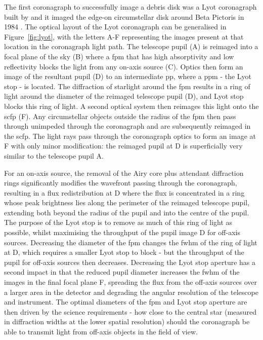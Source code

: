 \documentclass[letterpaper]{ar-1col}
\newcommand{\acc}[1]{\entry{\acs{#1}}{\acl{#1}}}
\begin{document}
The first coronagraph to successfully image a debris disk was a Lyot coronagraph built by \citet{Vilas87} and it imaged the edge-on circumstellar disk around Beta Pictoris in 1984 \citep{Smith84}.
%
The optical layout of the Lyot coronagraph can be generalised in Figure~\ref{fig:lyot}, with the letters A-F representing the images present at that location in the coronagraph light path.
%
The telescope pupil (A) is reimaged into a focal plane of the sky (B) where a \ac{fpm} that has high absorptivity and low reflectivity blocks the light from any on-axis source (C).
%
Optics then form an image of the resultant pupil (D) to an intermediate \ac{pp}, where a \ac{ppm} - the Lyot stop - is located.
%
The diffraction of starlight around the \ac{fpm} results in a ring of light around the diameter of the reimaged telescope pupil (D), and Lyot stop blocks this ring of light.
%
A second optical system then reimages this light onto the \ac{scfp} (F).
%
Any circumstellar objects outside the radius of the \ac{fpm} then pass through unimpeded through the coronagraph and are subsequently reimaged in the \ac{scfp}.
%
The light rays pass through the coronagraph optics to form an image at F with only minor modification: the reimaged pupil at D is superficially very similar to the telescope pupil A.

\begin{armarginnote}[]
\acc{fpm}
\acc{ppm}
\acc{scfp}
\end{armarginnote}

For an on-axis source, the removal of the Airy core plus attendant diffraction rings significantly modifies the wavefront passing through the coronagraph, resulting in a flux redistribution at D where the flux is concentrated in a ring whose peak brightness lies along the perimeter of the reimaged telescope pupil, extending both beyond the radius of the pupil and into the centre of the pupil.
%
The purpose of the Lyot stop is to remove as much of this ring of light as possible, whilst maximising the throughput of the pupil image D for off-axis sources.
%
Decreasing the diameter of the \ac{fpm} changes the \ac{fwhm} of the ring of light at D, which requires a smaller Lyot stop to block - but the throughput of the pupil for off-axis sources then decreases.
%
Decreasing the Lyot stop aperture has a second impact in that the reduced pupil diameter increases the \ac{fwhm} of the images in the final focal plane F, spreading the flux from the off-axis sources over a larger area in the detector and degrading the angular resolution of the telescope and instrument.
%
The optimal diameters of the \ac{fpm} and Lyot stop aperture are then driven by the science requirements - how close to the central star (measured in diffraction widths at the lower spatial resolution) should the coronagraph be able to transmit light from off-axis objects in the field of view.
\end{document}
